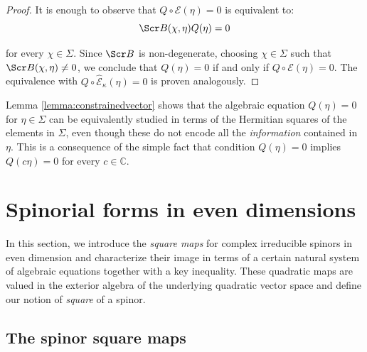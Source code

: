 \documentclass[10pt,a4paper,twoside,reqno]{amsart}
\theoremstyle{plain}
\theoremstyle{definition}
\theoremstyle{remark}
\def\C{\mathbb{C}}
\def\scB{\Scr B}
\def\cE{\mathcal{E}}
\def\hcE{\widehat{\mathcal{E}}}
\begin{document}
\begin{proof}
It is enough to observe that $Q\circ \cE(\eta) = 0$ is equivalent to:
\begin{equation*}
\scB( \chi ,\eta) Q(\eta) = 0
\end{equation*}

\noindent
for every $\chi\in \Sigma$. Since $\scB$ is non-degenerate, choosing $\chi\in \Sigma$ such that $\scB( \chi ,\eta) \neq 0$, we conclude that $Q(\eta) = 0$ if and only if $Q\circ \cE(\eta) = 0$. The equivalence with $Q\circ \hcE_{\kappa}(\eta) = 0$ is proven analogously.
\end{proof}

\noindent
Lemma \ref{lemma:constrainedvector} shows that the algebraic equation $Q(\eta) = 0$ for $\eta \in \Sigma$ can be equivalently studied in terms of the Hermitian squares of the elements in $\Sigma$, even though these do not encode all the \emph{information} contained in $\eta$. This is a consequence of the simple fact that condition $Q(\eta) = 0$ implies $Q(c \eta) = 0$ for every $c \in \C$.


\section{Spinorial forms in even dimensions}
\label{section:even_forms}


In this section, we introduce the \emph{square maps} for complex irreducible spinors in even dimension and characterize their image in terms of a certain natural system of algebraic equations together with a key inequality. These quadratic maps are valued in the exterior algebra of the underlying quadratic vector space and define our notion of \emph{square} of a spinor. 


\subsection{The spinor square maps}

\end{document}
